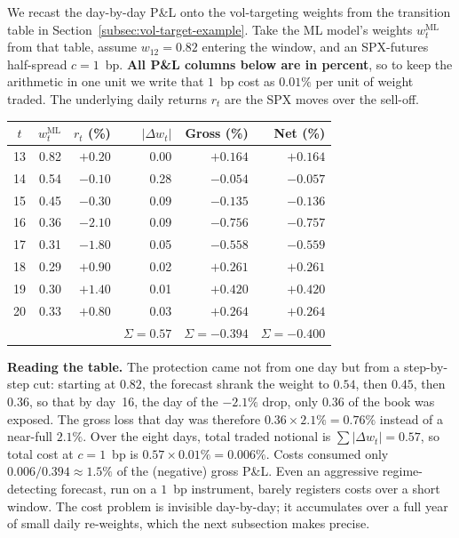 \begin{workedexample}
We recast the day-by-day P\&L onto the vol-targeting weights from the transition table in Section~\ref{subsec:vol-target-example}. Take the ML model's weights $w_t^{\text{ML}}$ from that table, assume $w_{12} = 0.82$ entering the window, and an SPX-futures half-spread $c = 1$~bp. \textbf{All P\&L columns below are in percent}, so to keep the arithmetic in one unit we write that $1$~bp cost as $0.01\%$ per unit of weight traded. The underlying daily returns $r_t$ are the SPX moves over the sell-off.

\medskip
\begin{center}
\begin{tabular}{crrrrr}
\toprule
$t$ & $w_t^{\text{ML}}$ & $r_t$ (\%) & $|\Delta w_t|$ & Gross (\%) & Net (\%) \\
\midrule
13 & 0.82 & $+0.20$ & 0.00 & $+0.164$ & $+0.164$ \\
14 & 0.54 & $-0.10$ & 0.28 & $-0.054$ & $-0.057$ \\
15 & 0.45 & $-0.30$ & 0.09 & $-0.135$ & $-0.136$ \\
16 & 0.36 & $-2.10$ & 0.09 & $-0.756$ & $-0.757$ \\
17 & 0.31 & $-1.80$ & 0.05 & $-0.558$ & $-0.559$ \\
18 & 0.29 & $+0.90$ & 0.02 & $+0.261$ & $+0.261$ \\
19 & 0.30 & $+1.40$ & 0.01 & $+0.420$ & $+0.420$ \\
20 & 0.33 & $+0.80$ & 0.03 & $+0.264$ & $+0.264$ \\
\midrule
   &      &         & $\Sigma = 0.57$ & $\Sigma = -0.394$ & $\Sigma = -0.400$ \\
\bottomrule
\end{tabular}
\end{center}

\medskip
\noindent\textbf{Reading the table.} The protection came not from one day but from a step-by-step cut: starting at $0.82$, the forecast shrank the weight to $0.54$, then $0.45$, then $0.36$, so that by day~16, the day of the $-2.1\%$ drop, only $0.36$ of the book was exposed. The gross loss that day was therefore $0.36 \times 2.1\% = 0.76\%$ instead of a near-full $2.1\%$. Over the eight days, total traded notional is $\sum|\Delta w_t| = 0.57$, so total cost at $c = 1$~bp is $0.57 \times 0.01\% = 0.006\%$. Costs consumed only $0.006/0.394 \approx 1.5\%$ of the (negative) gross P\&L. Even an aggressive regime-detecting forecast, run on a $1$~bp instrument, barely registers costs over a short window. The cost problem is invisible day-by-day; it accumulates over a full year of small daily re-weights, which the next subsection makes precise.
\end{workedexample}

